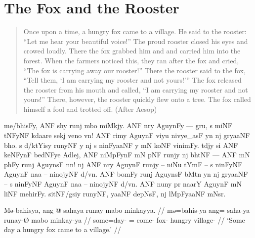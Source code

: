 \section{The Fox and the Rooster}
\label{sec:foxrooster}

\citep[Adapted from][]{becker:uebersetzungsaufgabe}\medskip

\blockquote{Once upon a time, a hungry fox came to a village. He said to the
rooster: \enquote{Let me hear your beautiful voice!} The proud rooster closed
his eyes and crowed loudly. There the fox grabbed him and and carried him into
the forest. When the farmers noticed this, they ran after the fox and cried,
\enquote{The fox is carrying away our rooster!} There the rooster said to the
fox, \enquote{Tell them, \enquote{I am carrying my rooster and not yours!}} The
fox released the rooster from his mouth and called, \enquote{I am carrying my
rooster and not yours!} There, however, the rooster quickly flew onto a tree.
The fox called himself a fool and trotted off. (After Aesop)}

\begin{flushleft}
\Tagati me/bhisFy, ANF shy runj mbo miMkjy. ANF nry AguynFy — gru, s
miNF tNFyNF kdaare sekj veno vn! ANF rimy AguynF viyu nivye\_asF yn nj gryaaNF
bho. s d/ktYisy runyNF y nj s ninFyaaNF y mN koNF vinimFy. tdjy si ANF keNFynF
bedNFye Adlej, ANF niMpFynF mN pNF runjy nj bhtNF — ANF mN phFy runj AguynsF
nn! nj ANF nry AguynF runjy – niNu tYmF – s ninFyNF AguynF naa – ninojyNF
d/vn. ANF bomFy runj AguynsF bMtn yn nj gryaaNF – s ninFyNF AguynF naa –
ninojyNF d/vn. ANF nuny pr naarY AguynF mN liNF mehirFy. sitNF/gsiy runyNF,
yaaNF depNsF, nj lMpFyaaNF mNsr.
\end{flushleft}

\medskip

\pex %
\a\begingl
	\gla Mə-bahisya, ang @ sahaya runay mabo minkayya. //
	\glb mə=bahis-ya ang= saha-ya runay-Ø mabo minkay-ya //
	\glc some=day-\Loc{} \AgtT{}= come-\TsgM{} fox-\Top{} hungry
		village-\Loc{} //
	\glft `Some day a hungry fox came to a village.' //
\endgl

